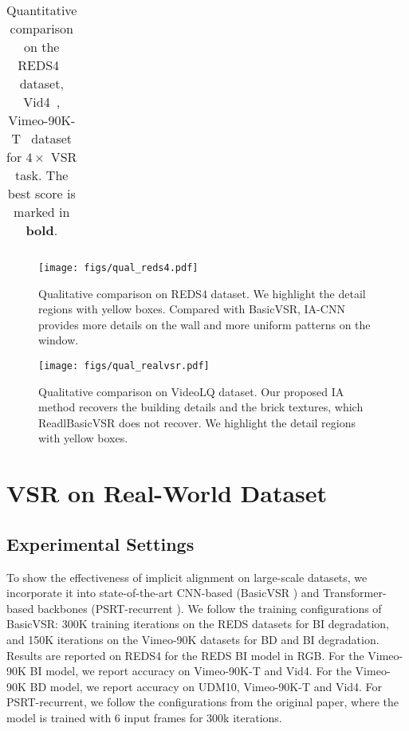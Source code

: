 \documentclass[10pt,twocolumn,letterpaper]{article}
\begin{document}
\begin{table*}[t]
{\begin{tabular}{l|c|c|cc|cc|cc}
    
  \end{tabular}}
    \vspace{-0.5em}
    \caption{Quantitative comparison on the REDS4~\cite{nah2019ntire} dataset, Vid4~\cite{liu2013bayesian}, Vimeo-90K-T~\cite{xue2019video_tof} dataset for $4\times$ VSR task. The best score is marked in \textbf{bold}.}\label{tab:comparision_sota}
    \vspace{-0.5em}
\end{table*}

\begin{figure*}[h!]
\centering

\texttt{[image: figs/qual\_reds4.pdf]}\label{fig:qual_reds4}

\vspace{-.3cm}
\caption{Qualitative comparison on REDS4 dataset. We highlight the detail regions with yellow boxes. Compared with BasicVSR, IA-CNN provides more details on the wall and more uniform patterns on the window.}
\vspace{-.5cm}
\end{figure*}


\begin{figure*}[t!]
\centering

\texttt{[image: figs/qual\_realvsr.pdf]}
\caption{Qualitative comparison on VideoLQ dataset. Our proposed IA method recovers the building details and the brick textures, which ReadlBasicVSR does not recover. We highlight the detail regions with yellow boxes.}\label{fig:qual_realvsr}
\end{figure*}

\section{VSR on Real-World Dataset}
\vspace{-0.2em}
\subsection{Experimental Settings}
\vspace{-0.2em}
To show the effectiveness of implicit alignment on large-scale datasets, we incorporate it into state-of-the-art CNN-based (BasicVSR \cite{chan2021basicvsr}) and Transformer-based backbones (PSRT-recurrent \cite{shi2022rethinking}).
We follow the training configurations of BasicVSR: 300K training iterations on the REDS datasets for BI degradation, and 150K iterations on the Vimeo-90K datasets for BD and BI degradation. Results are reported on REDS4 for the REDS BI model in RGB. For the Vimeo-90K BI model, we report accuracy on Vimeo-90K-T and Vid4. For the Vimeo-90K BD model, we report accuracy on UDM10, Vimeo-90K-T and Vid4. For PSRT-recurrent, we follow the configurations from the original paper, where the model is trained with 6 input frames for 300k iterations.
\vspace{-0.2em}
\end{document}
